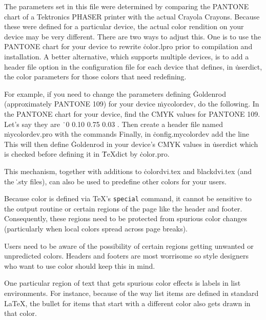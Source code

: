 The parameters set in this file were determined by comparing the
PANTONE chart of a Tektronics PHASER printer with the actual Crayola
Crayons.  Because these were defined for a particular device, the
actual color rendition on your device may be very different.  There
are two ways to adjust this.  One is to use the PANTONE chart for your
device to rewrite \.{color.lpro} prior to compilation and
installation.  A better alternative, which supports multiple devices,
is to add a header file option in the configuration file for each
device that defines, in \.{userdict}, the color parameters for those
colors that need redefining.

For example, if you need to change the parameters defining
\.{Goldenrod} (approximately PANTONE 109) for your device
\.{mycolordev}, do the following.  In the PANTONE chart for your
device, find the CMYK values for PANTONE 109.  Let's say they are
\.{\ 0 0.10 0.75 0.03 }. Then create a header file
named \.{mycolordev.pro} with the commands
\noindent
Finally, in \.{config.mycolordev} add the line
\noindent
This will then define \.{Goldenrod} in your device's CMYK values in
\.{userdict} which is checked before defining it in \.{TeXdict} by
\.{color.pro}.

This mechanism, together with additions to \.{colordvi.tex} and
\.{blackdvi.tex} (and the \.{.sty} files), can also be used to predefine
other colors for your users.


Because color is defined via \TeX's {\tt\ttbackslash special} command,
it cannot be sensitive to the output routine or certain regions of the
page like the header and footer.  Consequently, these regions need to
be protected from spurious color changes (particularly when local
colors spread across page breaks).

Users need to be aware of the possibility of certain regions getting
unwanted or unpredicted colors.  Headers and footers are most
worrisome so style designers who want to use color should keep this in
mind.

One particular region of text that gets spurious color effects is
labels in list environments.  For instance, because of the way list
items are defined in standard La\TeX, the bullet for items that
start with a different color also gets drawn in that color.

